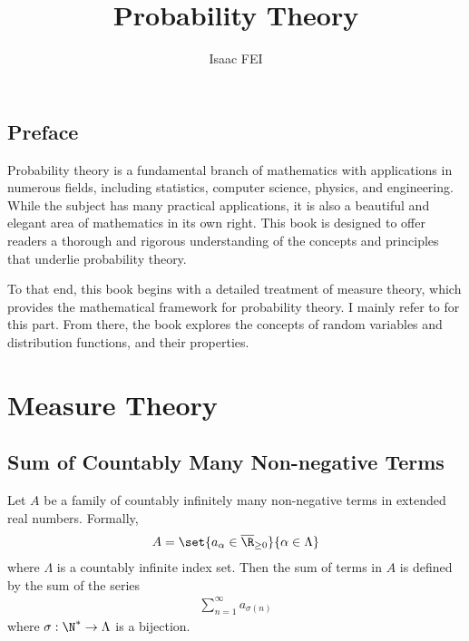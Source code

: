 \documentclass[thmcnt=section, 12pt, color=purple]{my-elegantbook}
\title{Probability Theory}
\author{Isaac FEI}
\begin{document}
\maketitle


\frontmatter
\section*{Preface}

Probability theory is a fundamental branch of mathematics 
with applications in numerous fields, 
including statistics, computer science, physics, and engineering. 
While the subject has many practical applications, 
it is also a beautiful and elegant area of mathematics in its own right. 
This book is designed to offer readers a thorough 
and rigorous understanding of the concepts 
and principles that underlie probability theory.

To that end, this book begins with a detailed treatment of measure theory, 
which provides the mathematical framework for probability theory. 
I mainly refer to \cite{taylorIntroductionMeasureIntegration1973}
for this part.
From there, the book explores the concepts of random variables
and distribution functions, and their properties. 


\tableofcontents
\mainmatter



\chapter{Measure Theory}


\section{Sum of Countably Many Non-negative Terms}


\begin{definition} \label{def:9}
	Let $A$ be a family of 
	countably infinitely many
	non-negative terms in extended real numbers.
	Formally,
	\begin{align*}
		A = \set{a_\alpha \in \overline{\R}_{\geq 0} }{\alpha \in \Lambda}
	\end{align*}
	where $\Lambda$ is a countably infinite index set.
	Then the sum of terms in $A$ is defined by 
	the sum of the series
	\begin{align*}
		\sum_{n=1}^\infty a_{\sigma(n)}
	\end{align*}
	where $\sigma: \N^\ast \to \Lambda$ is a bijection.
\end{definition}
\end{document}
